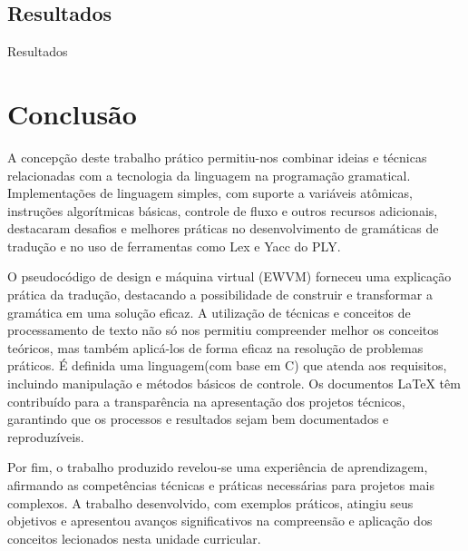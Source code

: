 \documentclass[12pt,a4paper]{report}
\begin{document}
\section{Resultados}
Resultados

\chapter{Conclus\~{a}o}
A concepção deste trabalho prático permitiu-nos combinar ideias e técnicas relacionadas com a tecnologia da linguagem na programação gramatical. Implementações de linguagem simples, com suporte a variáveis atômicas, instruções algorítmicas básicas, controle de fluxo e outros recursos adicionais, destacaram desafios e melhores práticas no desenvolvimento de gramáticas de tradução e no uso de ferramentas como Lex e Yacc do PLY.

O pseudocódigo de design e máquina virtual (EWVM) forneceu uma explicação prática da tradução, destacando a possibilidade de construir e transformar a gramática em uma solução eficaz. A utilização de técnicas e conceitos de processamento de texto não só nos permitiu compreender melhor os conceitos teóricos, mas também aplicá-los de forma eficaz na resolução de problemas práticos. É definida uma linguagem(com base em C) que atenda aos requisitos, incluindo manipulação e métodos básicos de controle. Os documentos LaTeX têm contribuído para a transparência na apresentação dos projetos técnicos, garantindo que os processos e resultados sejam bem documentados e reproduzíveis.

Por fim, o trabalho produzido revelou-se uma experiência de aprendizagem, afirmando as competências técnicas e práticas necessárias para projetos mais complexos. A trabalho desenvolvido, com exemplos práticos, atingiu seus objetivos e apresentou avanços significativos na compreensão e aplicação dos conceitos lecionados nesta unidade curricular.
\end{document}
